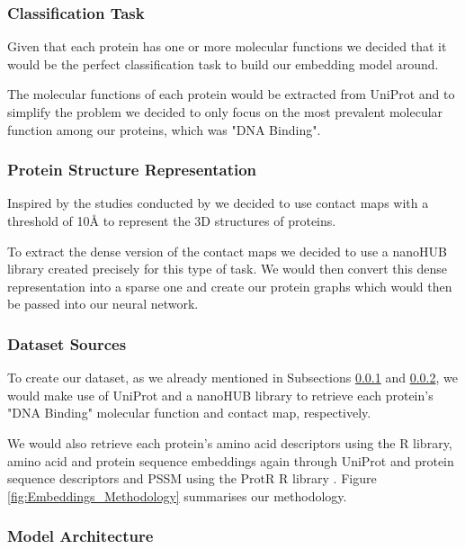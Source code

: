 \subsubsection{Classification Task}
\label{subsubsec:Classification_Task}

Given that each protein has one or more molecular functions we decided that it would be the perfect classification task to build our embedding model around. 

The molecular functions of each protein would be extracted from UniProt \citep{UniProt_Paper} and to simplify the problem we decided to only focus on the most prevalent molecular function among our proteins, which was "DNA Binding".

\subsubsection{Protein Structure Representation}
\label{subsubsec:Protein_Structure_Representation}

Inspired by the studies conducted by \citep{Jiang2020, Gligorijević} we decided to use contact maps with a threshold of 10\AA {} to represent the 3D structures of proteins. 

To extract the dense version of the contact maps we decided to use a nanoHUB library \citep{nanoHUB_Library} created precisely for this type of task. We would then convert this dense representation into a sparse one and create our protein graphs which would then be passed into our neural network.

\subsubsection{Dataset Sources}

To create our dataset, as we already mentioned in Subsections \ref{subsubsec:Classification_Task} and \ref{subsubsec:Protein_Structure_Representation}, we would make use of UniProt \citep{UniProt_Paper} and a nanoHUB library \citep{nanoHUB_Library} to retrieve each protein's "DNA Binding" molecular function and contact map, respectively. 

We would also retrieve each protein's amino acid descriptors using the \citet{Peptides} R library, amino acid and protein sequence embeddings again through UniProt and protein sequence descriptors and PSSM using the ProtR R library \citep{ProtR_Paper}. Figure \ref{fig:Embeddings_Methodology} summarises our methodology.

\subsubsection{Model Architecture}
\label{subsubsec:Model_Architecture}

